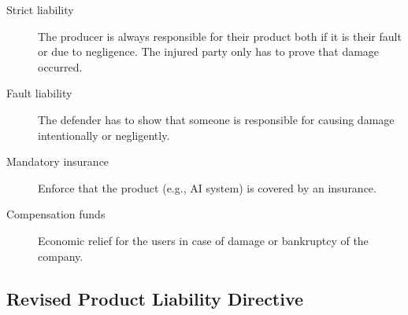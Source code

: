 \begin{description}
    \item[Strict liability] 
        The producer is always responsible for their product both if it is their fault or due to negligence. The injured party only has to prove that damage occurred.

    \item[Fault liability] 
        The defender has to show that someone is responsible for causing damage intentionally or negligently.

    \item[Mandatory insurance] 
        Enforce that the product (e.g., AI system) is covered by an insurance.

    \item[Compensation funds] 
        Economic relief for the users in case of damage or bankruptcy of the company.
\end{description}


\subsection{Revised Product Liability Directive}

